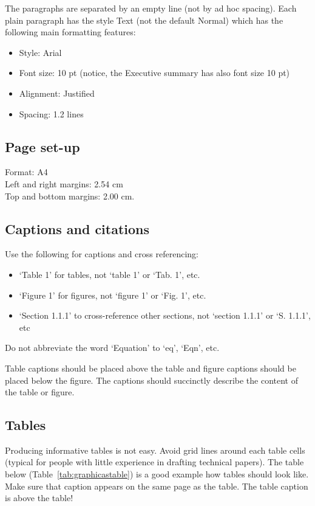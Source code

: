 \documentclass[10pt]{report}
\begin{document}
The paragraphs are separated by an empty line (not by ad hoc spacing). Each plain paragraph has the style Text (not the default Normal) which has the following main formatting features:

\begin{itemize}
\item Style: Arial
    \item Font size: 10 pt (notice, the Executive summary has also font size 10 pt)
    \item Alignment: Justified
    \item Spacing: 1.2 lines
\end{itemize}

\subsection{Page set-up}
    
Format: A4\\
Left and right margins: 2.54 cm\\
Top and bottom margins: 2.00 cm.

\subsection{Captions and citations}

Use the following for captions and cross referencing:

\begin{itemize}
\item ‘Table 1’ for tables, not ‘table 1’ or ‘Tab. 1’, etc.
\item ‘Figure 1’ for figures, not ‘figure 1’ or ‘Fig. 1’, etc.
\item ‘Section 1.1.1’ to cross-reference other sections, not ‘section 1.1.1’ or ‘S. 1.1.1’, etc
\end{itemize}

Do not abbreviate the word ‘Equation’ to ‘eq’, ‘Eqn’, etc.

Table captions should be placed above the table and figure captions
should be placed below the figure. The captions should succinctly
describe the content of the table or figure.

\subsection{Tables}

Producing informative tables is not easy. Avoid grid lines around each
table cells (typical for people with little experience in drafting
technical papers). The table below (Table~\ref{tab:graphicastable}) is
a good example how tables should look like. Make sure that caption
appears on the same page as the table. The table caption is above the
table!
\end{document}
